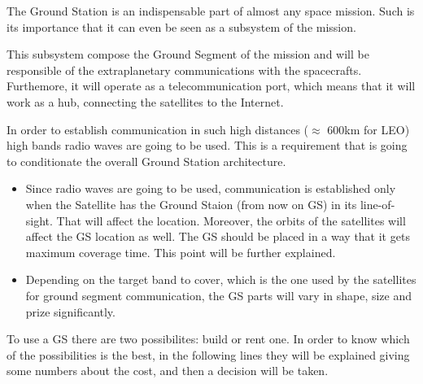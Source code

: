 
The Ground Station is an indispensable part of almost any space mission. Such is its importance that it can even be seen as a subsystem of the mission.
\newline

This subsystem compose the Ground Segment of the mission and will be responsible of the extraplanetary communications with the spacecrafts. Furthemore, it will operate as a telecommunication port, which means that it will work as a hub, connecting the satellites to the Internet.
\newline

In order to establish communication in such high distances ($\approx$ 600km for LEO) high bands radio waves are going to be used. This is a requirement that is going to conditionate the overall Ground Station architecture.

\begin{itemize}
\item Since radio waves are going to be used, communication is established only when the Satellite has the Ground Staion (from now on GS)  in its line-of-sight. That will affect the location. Moreover, the orbits of the satellites will affect the GS location as well. The GS should be placed in a way that it gets maximum coverage time. This point will be further explained.

\item Depending on the target band to cover, which is the one used by the satellites for ground segment communication, the GS parts will vary in shape, size and prize significantly.
\end{itemize}

To use a GS there are two possibilites: build or rent one. In order to know which of the possibilities is the best, in the following lines they will be explained giving some numbers about the cost, and then a decision will be taken. 
